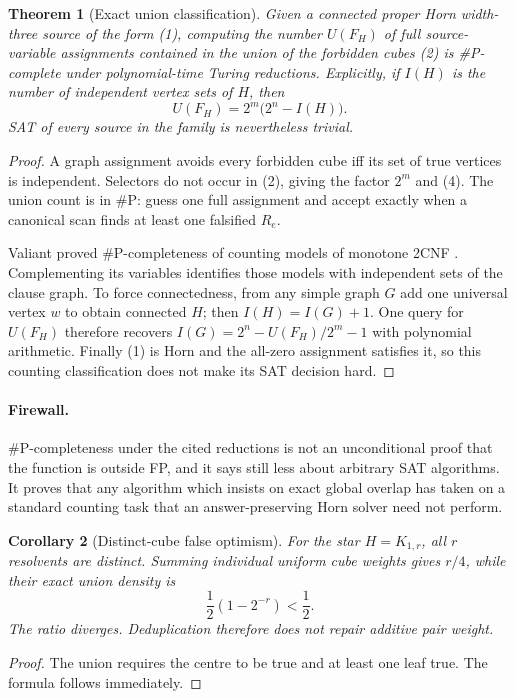 \documentclass[11pt]{article}
\newtheorem{theorem}{Theorem}
\newtheorem{corollary}[theorem]{Corollary}
\begin{document}
\begin{theorem}[Exact union classification]\label{th:hard}
Given a connected proper Horn width-three source of the form \emph{(1)},
computing the number $U(F_H)$ of full source-variable assignments contained
in the union of the forbidden cubes \emph{(2)} is \#P-complete under
polynomial-time Turing reductions.  Explicitly, if $I(H)$ is the number of
independent vertex sets of $H$, then
\[
U(F_H)=2^m\bigl(2^n-I(H)\bigr).                              \tag{4}
\]
SAT of every source in the family is nevertheless trivial.
\end{theorem}
\begin{proof}
A graph assignment avoids every forbidden cube iff its set of true vertices
is independent.  Selectors do not occur in (2), giving the factor $2^m$ and
(4).  The union count is in \#P: guess one full assignment and accept exactly
when a canonical scan finds at least one falsified $R_e$.

Valiant proved \#P-completeness of counting models of monotone 2CNF
\cite{Valiant}.  Complementing its variables identifies those models with
independent sets of the clause graph.  To force connectedness, from any simple
graph $G$ add one universal vertex $w$ to obtain connected $H$; then
$I(H)=I(G)+1$.  One query for $U(F_H)$ therefore recovers
$I(G)=2^n-U(F_H)/2^m-1$ with polynomial arithmetic.  Finally (1) is Horn and
the all-zero assignment satisfies it, so this counting classification does
not make its SAT decision hard.
\end{proof}

\paragraph{Firewall.}
\#P-completeness under the cited reductions is not an unconditional proof
that the function is outside FP, and it says still less about arbitrary SAT
algorithms.  It proves that any algorithm which insists on exact global
overlap has taken on a standard counting task that an answer-preserving Horn
solver need not perform.

\begin{corollary}[Distinct-cube false optimism]
For the star $H=K_{1,r}$, all $r$ resolvents are distinct.  Summing individual
uniform cube weights gives $r/4$, while their exact union density is
\[
\frac12(1-2^{-r})<\frac12.
\]
The ratio diverges.  Deduplication therefore does not repair additive pair
weight.
\end{corollary}
\begin{proof}
The union requires the centre to be true and at least one leaf true.  The
formula follows immediately.
\end{proof}
\end{document}
